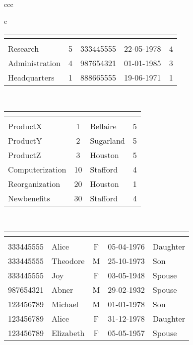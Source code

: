 {\begin{tabular}{ccc}
\begin{tabular}{c}
\begin{tabular}[t]{lclcc}
\multicolumn{5}{l}{\tablabel{Department}} \\ \toprule
\fieldlabel{DName} & \fieldlabel{\underbar{DNumber}} & \fieldlabel{MgrSSN} & \fieldlabel{MgrStartDate} & \fieldlabel{nbrEmployees} \\ \midrule
Research & 5 & 333445555 & 22-05-1978 & 4 \\
Administration & 4 & 987654321 & 01-01-1985 & 3 \\
Headquarters & 1 & 888665555 & 19-06-1971 & 1 \\ \bottomrule
\end{tabular}
\vspace*{7mm}\\
\begin{tabular}{lclc}
\multicolumn{4}{l}{\tablabel{Project}} \\ \toprule
\fieldlabel{PName} & \fieldlabel{\underbar{PNumber}} & \fieldlabel{PLocation} & \fieldlabel{DNumber} \\ \midrule
ProductX & 1 & Bellaire & 5 \\
ProductY & 2 & Sugarland & 5 \\
ProductZ & 3 & Houston & 5 \\
Computerization & 10 & Stafford & 4 \\
Reorganization & 20 & Houston & 1 \\
Newbenefits & 30 & Stafford & 4 \\ \bottomrule
\end{tabular}
\vspace*{7mm}\\
\begin{tabular}{llccl}
\multicolumn{5}{l}{\tablabel{Dependent}} \\ \toprule
\fieldlabel{\underbar{ESSN}} & \fieldlabel{\underbar{DependentName}} & \fieldlabel{Sex} & \fieldlabel{BDate} & \fieldlabel{Relationship} \\ \midrule
333445555 & Alice & F & 05-04-1976 & Daughter \\
333445555 & Theodore & M & 25-10-1973 & Son \\
333445555 & Joy & F & 03-05-1948 & Spouse \\
987654321 & Abner & M & 29-02-1932 & Spouse \\
123456789 & Michael & M & 01-01-1978 & Son \\
123456789 & Alice & F & 31-12-1978 & Daughter \\
123456789 & Elizabeth & F & 05-05-1957 & Spouse \\ \bottomrule
\end{tabular}
\end{tabular}


\end{tabular}}
